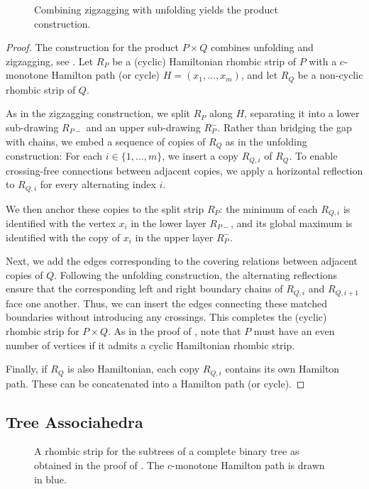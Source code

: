 \documentclass[fontsize=11pt,a4paper,DIV=12]{scrartcl}
\begin{document}
\begin{figure}[!ht]
	\centering
	
	\caption{Combining zigzagging with unfolding yields the product construction.}
	\label{fig:product}
\end{figure}

\products*
\begin{proof}
	The construction for the product $P \times Q$ combines unfolding and zigzagging, see . Let $R_P$ be a (cyclic) Hamiltonian rhombic strip of $P$ with a $c$-monotone Hamilton path (or cycle) $H = (x_1, \ldots, x_m)$, and let $R_Q$ be a non-cyclic rhombic strip of $Q$.

	As in the zigzagging construction, we split $R_P$ along $H$, separating it into a lower sub-drawing $R_{P-}$ and an upper sub-drawing $R_P^-$. Rather than bridging the gap with chains, we embed a sequence of copies of $R_Q$ as in the unfolding construction: For each $i \in \{1, \ldots, m\}$, we insert a copy $R_{Q,i}$ of $R_Q$. To enable crossing-free connections between adjacent copies, we apply a horizontal reflection to $R_{Q,i}$ for every alternating index $i$.

	We then anchor these copies to the split strip $R_P$: the minimum of each $R_{Q,i}$ is identified with the vertex $x_i$ in the lower layer $R_{P-}$, and its global maximum is identified with the copy of $x_i$ in the upper layer $R_P^-$.

	Next, we add the edges corresponding to the covering relations between adjacent copies of $Q$. Following the unfolding construction, the alternating reflections ensure that the corresponding left and right boundary chains of $R_{Q,i}$ and $R_{Q,i+1}$ face one another. Thus, we can insert the edges connecting these matched boundaries without introducing any crossings. This completes the (cyclic) rhombic strip for $P \times Q$. As in the proof of , note that $P$ must have an even number of vertices if it admits a cyclic Hamiltonian rhombic strip.

	Finally, if $R_Q$ is also Hamiltonian, each copy $R_{Q,i}$ contains its own Hamilton path. These can be concatenated into a Hamilton path (or cycle).
\end{proof}

\subsection{Tree Associahedra}

\begin{figure}[!ht]
	\centering
	
	\caption{A rhombic strip for the subtrees of a complete binary tree as obtained in the proof of . The $c$-monotone Hamilton path is drawn in blue.}
	\label{fig:complete binary tree rs}
\end{figure}
\end{document}
